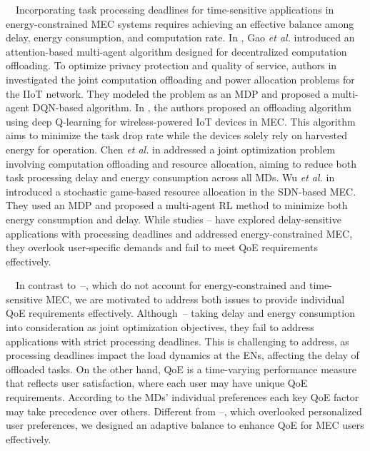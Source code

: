 \documentclass[12pt,draftclsnofoot,onecolumn]{IEEEtran}
\newenvironment{my}[2]%
{\begin{list}{}%
{\setlength{\rightmargin}{#1}\setlength{\leftmargin}{#2}}%


 \item[]{}

} {\end{list}}
\begin{document}
\begin{enumerate}
\begin{my}{1cm}{1cm}
{	
		\,\,\,\,
		Incorporating task processing deadlines for time-sensitive applications in energy-constrained MEC systems requires achieving an effective balance among delay, energy consumption, and computation rate. 
		In \cite{gao2022large}, Gao \textit{et al.} introduced an attention-based multi-agent algorithm designed for decentralized computation offloading.
		To optimize privacy protection and quality of service, authors in \cite{wu2024privacy} investigated the joint computation offloading and power allocation problems for the IIoT network. They modeled the problem as an MDP and proposed a multi-agent DQN-based algorithm. 
		In \cite{Bolourian-WCL24}, the authors proposed an offloading algorithm using deep Q-learning for wireless-powered IoT devices in MEC. This algorithm aims to minimize the task drop rate while the devices solely rely on harvested energy for operation. 
		Chen \textit{et al.} in \cite{chen2021drl} addressed a joint optimization problem involving computation offloading and resource allocation, aiming to reduce both task processing delay and energy consumption across all MDs.
		Wu \textit{et al.} in \cite{wu2023computation} introduced a stochastic game-based resource allocation in the SDN-based MEC. They used an MDP and proposed a multi-agent RL method to minimize both energy consumption and delay. While studies \cite{gao2022large}--\cite{wu2023computation} have explored delay-sensitive applications with processing deadlines and addressed energy-constrained MEC, they overlook user-specific demands and fail to meet QoE requirements effectively.\vspace{2mm}
		
		
		
		\,\,\,\,
		In contrast to~\cite{zhang2023offline}--\cite{huang2021deadline}, which do not account for energy-constrained and time-sensitive MEC, we are motivated to address both issues to provide individual QoE requirements effectively. 
		Although~\cite{liao2023online}--\cite{she2024efficient} taking delay and energy consumption into consideration as joint optimization objectives, they fail to address applications with strict processing deadlines. This is challenging to address, as processing deadlines impact the load dynamics at the ENs, affecting the delay of offloaded tasks.  
		On the other hand, QoE is a time-varying performance measure that reflects user satisfaction, where each user may have unique QoE requirements. According to the MDs' individual preferences each key QoE factor may take precedence over others. Different from \cite{gao2022large}--\cite{wu2023computation}, which overlooked personalized user preferences, we designed an adaptive balance to enhance QoE for MEC users effectively. \vspace{2mm}
		
}
\end{my}
\end{enumerate}
\end{document}
